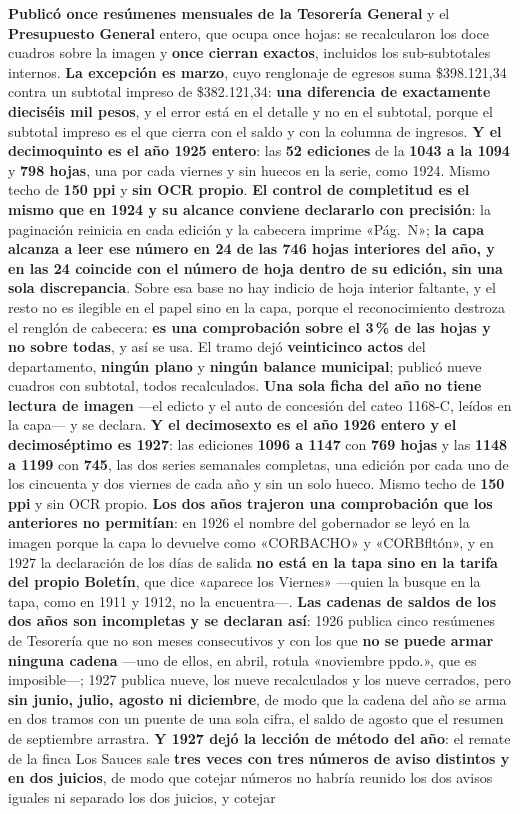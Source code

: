 \textbf{Publicó once resúmenes mensuales de la Tesorería General} y el \textbf{Presupuesto General} entero, que ocupa once hojas: se recalcularon los doce cuadros sobre la imagen y \textbf{once cierran exactos}, incluidos los sub-subtotales internos. \textbf{La excepción es marzo}, cuyo renglonaje de egresos suma \$398.121,34 contra un subtotal impreso de \$382.121,34: \textbf{una diferencia de exactamente dieciséis mil pesos}, y el error está en el detalle y no en el subtotal, porque el subtotal impreso es el que cierra con el saldo y con la columna de ingresos. \textbf{Y el decimoquinto es el año 1925 entero}: las \textbf{52 ediciones} de la \textbf{1043 a la 1094} y \textbf{798 hojas}, una por cada viernes y sin huecos en la serie, como 1924. Mismo techo de \textbf{150 ppi} y \textbf{sin OCR propio}. \textbf{El control de completitud es el mismo que en 1924 y su alcance conviene declararlo con precisión}: la paginación reinicia en cada edición y la cabecera imprime «Pág.\ N»; \textbf{la capa alcanza a leer ese número en 24 de las 746 hojas interiores del año, y en las 24 coincide con el número de hoja dentro de su edición, sin una sola discrepancia}. Sobre esa base no hay indicio de hoja interior faltante, y el resto no es ilegible en el papel sino en la capa, porque el reconocimiento destroza el renglón de cabecera: \textbf{es una comprobación sobre el 3\,\% de las hojas y no sobre todas}, y así se usa. El tramo dejó \textbf{veinticinco actos} del departamento, \textbf{ningún plano} y \textbf{ningún balance municipal}; publicó nueve cuadros con subtotal, todos recalculados. \textbf{Una sola ficha del año no tiene lectura de imagen} ---el edicto y el auto de concesión del cateo 1168-C, leídos en la capa--- y se declara. \textbf{Y el decimosexto es el año 1926 entero y el decimoséptimo es 1927}: las ediciones \textbf{1096 a 1147} con \textbf{769 hojas} y las \textbf{1148 a 1199} con \textbf{745}, las dos series semanales completas, una edición por cada uno de los cincuenta y dos viernes de cada año y sin un solo hueco. Mismo techo de \textbf{150 ppi} y sin OCR propio. \textbf{Los dos años trajeron una comprobación que los anteriores no permitían}: en 1926 el nombre del gobernador se leyó en la imagen porque la capa lo devuelve como «CORBACHO» y «CORBfltón», y en 1927 la declaración de los días de salida \textbf{no está en la tapa sino en la tarifa del propio Boletín}, que dice «aparece los Viernes» ---quien la busque en la tapa, como en 1911 y 1912, no la encuentra---. \textbf{Las cadenas de saldos de los dos años son incompletas y se declaran así}: 1926 publica cinco resúmenes de Tesorería que no son meses consecutivos y con los que \textbf{no se puede armar ninguna cadena} ---uno de ellos, en abril, rotula «noviembre ppdo.», que es imposible---; 1927 publica nueve, los nueve recalculados y los nueve cerrados, pero \textbf{sin junio, julio, agosto ni diciembre}, de modo que la cadena del año se arma en dos tramos con un puente de una sola cifra, el saldo de agosto que el resumen de septiembre arrastra. \textbf{Y 1927 dejó la lección de método del año}: el remate de la finca Los Sauces sale \textbf{tres veces con tres números de aviso distintos y en dos juicios}, de modo que cotejar números no habría reunido los dos avisos iguales ni separado los dos juicios, y cotejar 